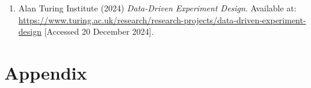 \documentclass{article}
\begin{document}
\begin{enumerate}
        \item Alan Turing Institute (2024) \textit{Data-Driven Experiment Design}. Available at: \url{https://www.turing.ac.uk/research/research-projects/data-driven-experiment-design} [Accessed 20 December 2024].
        
        
        
        
        
    \end{enumerate}

    
    
    

    \newpage\vspace*{-5pt}
    
   
    
\section{Appendix}
\normalsize
\renewcommand{\thesubsection}{\Alph{subsection}}
\end{document}
